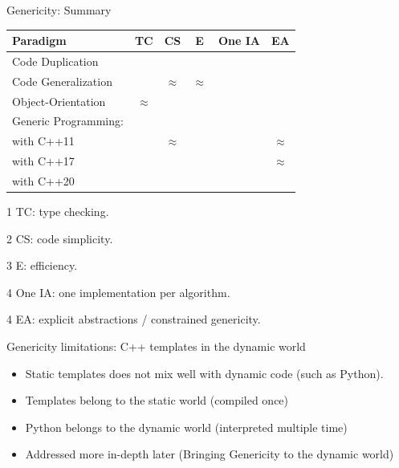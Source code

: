 \documentclass[12pt,aspectratio=169]{beamer}
\newcommand{\cmark}{\ding{51}}%
\newcommand{\xmark}{\ding{55}}%
\newcommand{\eqmark}{{\bf \(\approx\)}}
\begin{document}
\begin{frame}[fragile]{Genericity: Summary}
  \begin{table}[htbp]
    \centering
    \small
    \begin{threeparttable}
      \begin{tabular}[width=0.8\linewidth]{l|ccccc}
        Paradigm             & TC\tnote{1} & CS\tnote{2} & E\tnote{3} & One IA\tnote{4} & EA\tnote{5} \\
        \hline
        Code Duplication     & \cmark      & \xmark      & \cmark     & \xmark          & \xmark      \\
        Code Generalization  & \xmark      & \eqmark     & \eqmark    & \cmark          & \xmark      \\
        Object-Orientation   & \eqmark     & \cmark      & \xmark     & \cmark          & \cmark      \\
        Generic Programming: &             &             &            &                 &             \\
        \quad with C++11     & \cmark      & \eqmark     & \cmark     & \cmark          & \eqmark     \\
        \quad with C++17     & \cmark      & \cmark      & \cmark     & \cmark          & \eqmark     \\
        \quad with C++20     & \cmark      & \cmark      & \cmark     & \cmark          & \cmark      \\
      \end{tabular}
      \begin{tablenotes}
        \item[1] TC: type checking.
        \item[2] CS: code simplicity.
        \item[3] E: efficiency.
        \item[4] One IA: one implementation per algorithm.
        \item[4] EA: explicit abstractions / constrained genericity.
      \end{tablenotes}
      \label{table:gen.approaches}
    \end{threeparttable}
  \end{table}
\end{frame}

\begin{frame}[fragile]{Genericity limitations: C++ templates in the dynamic world}
  \begin{itemize}
    \item Static templates does not mix well with dynamic code (such as Python).
    \item Templates belong to the static world (compiled once)
    \item Python belongs to the dynamic world (interpreted multiple time)
    \item Addressed more in-depth later (Bringing Genericity to the dynamic world)
  \end{itemize}
\end{frame}
\end{document}
